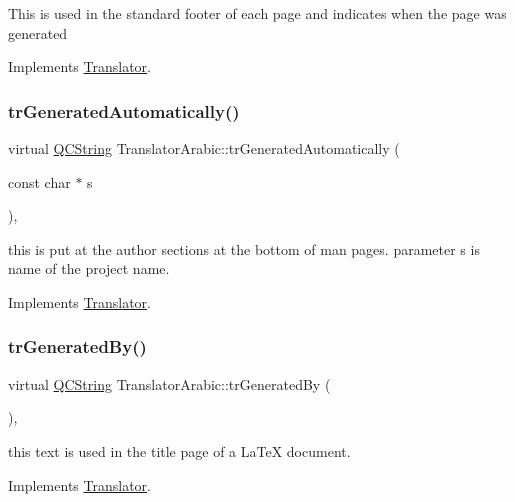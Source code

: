 This is used in the standard footer of each page and indicates when the page was generated 

Implements \mbox{\hyperlink{class_translator}{Translator}}.

\mbox{\label{class_translator_arabic_a5dd76439e7f830bd9384a1a48ffdd12d}} 
\subsubsection{\texorpdfstring{trGeneratedAutomatically()}{trGeneratedAutomatically()}}
{\footnotesize\ttfamily virtual \mbox{\hyperlink{class_q_c_string}{Q\+C\+String}} Translator\+Arabic\+::tr\+Generated\+Automatically (\begin{DoxyParamCaption}\item[{const char $\ast$}]{s }\end{DoxyParamCaption})\hspace{0.3cm}{\ttfamily [inline]}, {\ttfamily [virtual]}}

this is put at the author sections at the bottom of man pages. parameter s is name of the project name. 

Implements \mbox{\hyperlink{class_translator}{Translator}}.

\mbox{\label{class_translator_arabic_ac92207fe531289a746c7271f14c13a0d}} 
\subsubsection{\texorpdfstring{trGeneratedBy()}{trGeneratedBy()}}
{\footnotesize\ttfamily virtual \mbox{\hyperlink{class_q_c_string}{Q\+C\+String}} Translator\+Arabic\+::tr\+Generated\+By (\begin{DoxyParamCaption}{ }\end{DoxyParamCaption})\hspace{0.3cm}{\ttfamily [inline]}, {\ttfamily [virtual]}}

this text is used in the title page of a La\+TeX document. 

Implements \mbox{\hyperlink{class_translator}{Translator}}.

